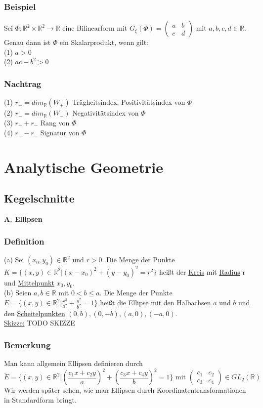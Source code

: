 \documentclass[a4paper]{article}
\newcommand{\ul}{\underline}
\begin{document}
\subsubsection{Beispiel}
Sei \(\Phi:\mathbb{R}^2\times\mathbb{R}^2\rightarrow\mathbb{R}\) eine Bilinearform mit \(G_\xi(\Phi)=\begin{pmatrix}
a & b\\
c & d
\end{pmatrix}\) mit \(a,b,c,d\in\mathbb{R}\). Genau dann ist \(\Phi\) ein Skalarprodukt, wenn gilt:\\
(1) \(a > 0\)\\
(2) \(ac-b^2 > 0\)
\subsubsection{Nachtrag}
(1) \(r_+=dim_\mathbb{R}(W_+)\) Trägheitsindex, Positivitätsindex von \(\Phi\)\\
(2) \(r_-=dim_\mathbb{R}(W_-)\) Negativitätsindex von \(\Phi\)\\
(3) \(r_++r_-\) Rang von \(\Phi\)\\
(4) \(r_+-r_-\) Signatur von \(\Phi\)
\section{Analytische Geometrie}
\setcounter{subsection}{30}
\subsection{Kegelschnitte}
\textbf{A. Ellipsen}
\subsubsection{Definition}
(a) Sei \((x_0,y_0)\in\mathbb{R}^2\) und \(r>0\). Die Menge der Punkte \(K=\{(x,y)\in\mathbb{R}^2|(x-x_0)^2+(y-y_0)^2=r^2\}\) heißt der \ul{Kreis} mit \ul{Radius} r und \ul{Mittelpunkt} \(x_0,y_0\).\\
(b) Seien \(a,b\in\mathbb{R}\) mit \(0<b\leq a\). Die Menge der Punkte \(E=\{(x,y)\in\mathbb{R}^2|\frac{x^2}{a^2}+\frac{y^2}{b^2}=1\}\) heißt die \ul{Ellipse} mit den \ul{Halbachsen} \(a\) und \(b\) und den \ul{Scheitelpunkten} \((0,b),(0,-b),(a,0),(-a,0)\).\\
\ul{Skizze:} TODO SKIZZE
\subsubsection{Bemerkung}
Man kann allgemein Ellipsen definieren durch
$$\tilde{E}=\{(x,y)\in\mathbb{R}^2|(\frac{c_1x+c_2y}{a})^2+(\frac{c_3x+c_4y}{b})^2=1\} \text{ mit } \begin{pmatrix}
c_1 & c_2 \\
c_3 & c_4
\end{pmatrix}\in GL_2(\mathbb{R})$$
Wir werden später sehen, wie man Ellipsen durch Koordinatentransformationen in Standardform bringt.
\end{document}
